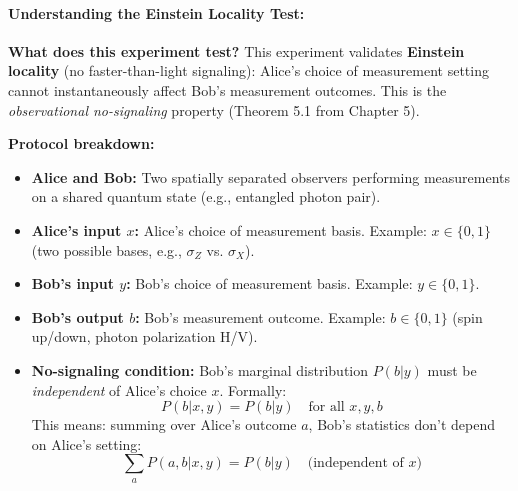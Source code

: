 \paragraph{Understanding the Einstein Locality Test:}

\textbf{What does this experiment test?} This experiment validates \textbf{Einstein locality} (no faster-than-light signaling): Alice's choice of measurement setting cannot instantaneously affect Bob's measurement outcomes. This is the \textit{observational no-signaling} property (Theorem 5.1 from Chapter 5).

\textbf{Protocol breakdown:}
\begin{itemize}
    \item \textbf{Alice and Bob:} Two spatially separated observers performing measurements on a shared quantum state (e.g., entangled photon pair).
    
    \item \textbf{Alice's input $x$:} Alice's choice of measurement basis. Example: $x \in \{0, 1\}$ (two possible bases, e.g., $\sigma_Z$ vs. $\sigma_X$).
    
    \item \textbf{Bob's input $y$:} Bob's choice of measurement basis. Example: $y \in \{0, 1\}$.
    
    \item \textbf{Bob's output $b$:} Bob's measurement outcome. Example: $b \in \{0, 1\}$ (spin up/down, photon polarization H/V).
    
    \item \textbf{No-signaling condition:} Bob's marginal distribution $P(b|y)$ must be \textit{independent} of Alice's choice $x$. Formally:
    \[
    P(b|x,y) = P(b|y) \quad \text{for all } x, y, b
    \]
    This means: summing over Alice's outcome $a$, Bob's statistics don't depend on Alice's setting:
    \[
    \sum_a P(a,b|x,y) = P(b|y) \quad \text{(independent of } x\text{)}
    \]
\end{itemize}

